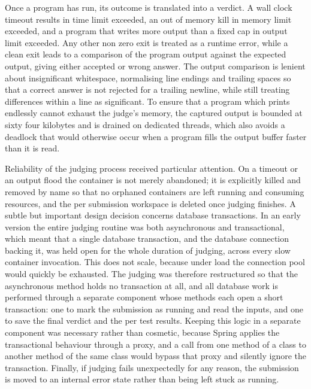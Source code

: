 \documentclass[12pt,a4paper]{report}
\begin{document}
Once a program has run, its outcome is translated into a verdict. A wall clock timeout results in time limit exceeded, an out of memory kill in memory limit exceeded, and a program that writes more output than a fixed cap in output limit exceeded. Any other non zero exit is treated as a runtime error, while a clean exit leads to a comparison of the program output against the expected output, giving either accepted or wrong answer. The output comparison is lenient about insignificant whitespace, normalising line endings and trailing spaces so that a correct answer is not rejected for a trailing newline, while still treating differences within a line as significant. To ensure that a program which prints endlessly cannot exhaust the judge's memory, the captured output is bounded at sixty four kilobytes and is drained on dedicated threads, which also avoids a deadlock that would otherwise occur when a program fills the output buffer faster than it is read.

Reliability of the judging process received particular attention. On a timeout or an output flood the container is not merely abandoned; it is explicitly killed and removed by name so that no orphaned containers are left running and consuming resources, and the per submission workspace is deleted once judging finishes. A subtle but important design decision concerns database transactions. In an early version the entire judging routine was both asynchronous and transactional, which meant that a single database transaction, and the database connection backing it, was held open for the whole duration of judging, across every slow container invocation. This does not scale, because under load the connection pool would quickly be exhausted. The judging was therefore restructured so that the asynchronous method holds no transaction at all, and all database work is performed through a separate component whose methods each open a short transaction: one to mark the submission as running and read the inputs, and one to save the final verdict and the per test results. Keeping this logic in a separate component was necessary rather than cosmetic, because Spring applies the transactional behaviour through a proxy, and a call from one method of a class to another method of the same class would bypass that proxy and silently ignore the transaction. Finally, if judging fails unexpectedly for any reason, the submission is moved to an internal error state rather than being left stuck as running.
\end{document}
